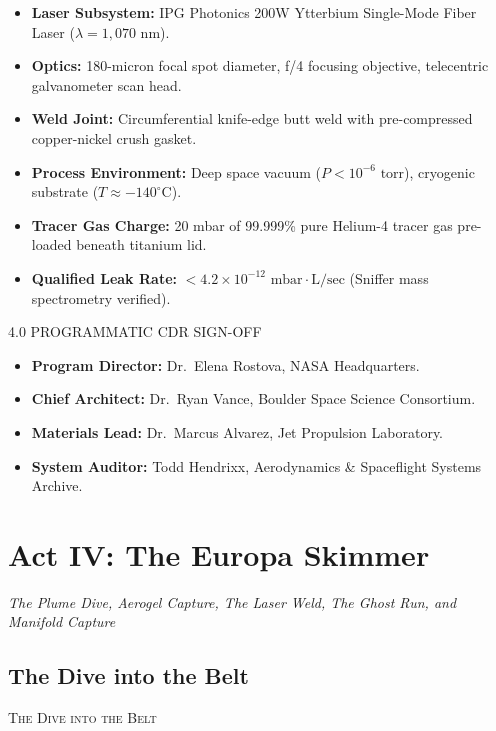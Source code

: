\documentclass[12pt,twoside,openright]{book}
\newcommand{\sceneheader}[1]{%
  \par\vspace{1.8em}%
  {\noindent\centering\scshape\large #1\par}%
  \vspace{1.0em}%
  \noindent%
}
\newcommand{\dinkus}{%
  \par\vspace{1.2em}%
  {\noindent\centering{\large $\ast\quad\ast\quad\ast$}\par}%
  \vspace{1.2em}%
  \noindent%
}
\providecommand{\tightlist}{\setlength{\itemsep}{0pt}\setlength{\parskip}{0pt}
\setlength{\tabcolsep}{2pt}}
\begin{document}
\begin{itemize}
\tightlist
\item
  \textbf{Laser Subsystem:} IPG Photonics 200W Ytterbium Single-Mode
  Fiber Laser (\(\lambda = 1,070\text{ nm}\)).
\item
  \textbf{Optics:} 180-micron focal spot diameter, f/4 focusing
  objective, telecentric galvanometer scan head.
\item
  \textbf{Weld Joint:} Circumferential knife-edge butt weld with
  pre-compressed copper-nickel crush gasket.
\item
  \textbf{Process Environment:} Deep space vacuum
  (\(P < 10^{-6}\text{ torr}\)), cryogenic substrate
  (\(T \approx -140^\circ\text{C}\)).
\item
  \textbf{Tracer Gas Charge:} 20 mbar of 99.999\% pure Helium-4 tracer
  gas pre-loaded beneath titanium lid.
\item
  \textbf{Qualified Leak Rate:}
  \(< 4.2 \times 10^{-12}\text{ mbar}\cdot\text{L/sec}\) (Sniffer mass
  spectrometry verified).
\end{itemize}

\dinkus

\sceneheader{4.0 PROGRAMMATIC CDR
SIGN-OFF}

\begin{itemize}
\tightlist
\item
  \textbf{Program Director:} Dr.~Elena Rostova, NASA Headquarters.
\item
  \textbf{Chief Architect:} Dr.~Ryan Vance, Boulder Space Science
  Consortium.
\item
  \textbf{Materials Lead:} Dr.~Marcus Alvarez, Jet Propulsion
  Laboratory.
\item
  \textbf{System Auditor:} Todd Hendrixx, Aerodynamics \& Spaceflight
  Systems Archive.
\end{itemize}

\cleardoublepage
\part{Act IV: The Europa Skimmer}
\begin{center}\large\itshape The Plume Dive, Aerogel Capture, The Laser Weld, The Ghost Run, and Manifold Capture\end{center}
\vspace*{30pt}
\chapter{The Dive into the Belt}
\sceneheader{The Dive into the Belt}
\end{document}
